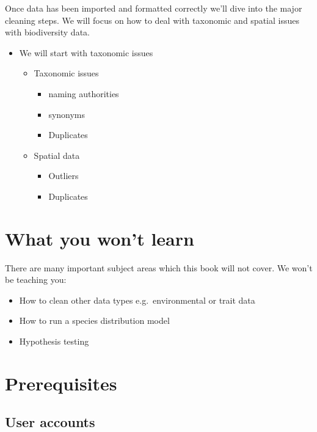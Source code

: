 \documentclass[
  letterpaper,
  DIV=11,
  numbers=noendperiod,
  oneside]{scrreprt}
\providecommand{\tightlist}{%
  \setlength{\itemsep}{0pt}\setlength{\parskip}{0pt}}\usepackage{longtable,booktabs,array}
\begin{document}
Once data has been imported and formatted correctly we'll dive into the
major cleaning steps. We will focus on how to deal with taxonomic and
spatial issues with biodiversity data.

\begin{itemize}
\tightlist
\item
  We will start with taxonomic issues

  \begin{itemize}
  \tightlist
  \item
    Taxonomic issues

    \begin{itemize}
    \tightlist
    \item
      naming authorities
    \item
      synonyms
    \item
      Duplicates
    \end{itemize}
  \item
    Spatial data

    \begin{itemize}
    \tightlist
    \item
      Outliers
    \item
      Duplicates
    \end{itemize}
  \end{itemize}
\end{itemize}

\hypertarget{what-you-wont-learn}{%
\section{What you won't learn}\label{what-you-wont-learn}}

There are many important subject areas which this book will not cover.
We won't be teaching you:

\begin{itemize}
\tightlist
\item
  How to clean other data types e.g.~environmental or trait data
\item
  How to run a species distribution model
\item
  Hypothesis testing
\end{itemize}

\hypertarget{prerequisites}{%
\section{Prerequisites}\label{prerequisites}}

\hypertarget{user-accounts}{%
\subsection{User accounts}\label{user-accounts}}
\end{document}
